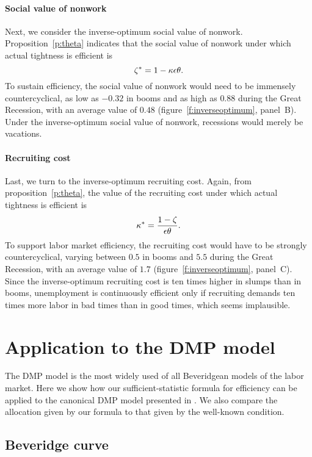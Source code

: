 \documentclass[letterpaper,12pt,leqno]{article}
\begin{document}
\paragraph{Social value of nonwork} Next, we consider the inverse-optimum social value of nonwork. Proposition~\ref{p:theta} indicates that the social value of nonwork under which actual tightness is efficient is
\begin{equation}
\zeta^* = 1-\kappa\epsilon\theta.
\label{e:zeta}\end{equation}
To sustain efficiency, the social value of nonwork would need to be immensely countercyclical, as low as $-0.32$ in booms and as high as $0.88$ during the Great Recession, with an average value of $0.48$ (figure~\ref{f:inverseoptimum}, panel~B). Under the inverse-optimum social value of nonwork, recessions would merely be vacations.

\paragraph{Recruiting cost} Last, we turn to the inverse-optimum recruiting cost. Again, from proposition~\ref{p:theta}, the value of the recruiting cost under which actual tightness is efficient is
\begin{equation}
\kappa^* = \frac{1-\zeta}{\epsilon\theta}.
\label{e:kappa}\end{equation}
To support labor market efficiency, the recruiting cost would have to be strongly countercyclical, varying between $0.5$ in booms and $5.5$ during the Great Recession, with an average value of $1.7$ (figure~\ref{f:inverseoptimum}, panel~C). Since the inverse-optimum recruiting cost is ten times higher in slumps than in booms, unemployment is continuously efficient only if recruiting demands ten times more labor in bad times than in good times, which seems implausible. 

\section{Application to the DMP model}\label{s:dmp}

The DMP model is the most widely used of all Beveridgean models of the labor market. Here we show how our sufficient-statistic formula for efficiency can be applied to the canonical DMP model presented in . We also compare the allocation given by our formula to that given by the well-known  condition. 

\subsection{Beveridge curve}
\end{document}
